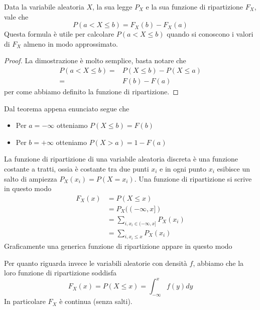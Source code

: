 \begin{theorem}\label{th: diff_cdf}
	Data la variabile aleatoria $X$, la sua legge $P_X$ e la sua funzione di ripartizione $F_X$,
	vale che
	\[ P(a < X \leq b) = F_X (b) - F_X(a) \]
	Questa formula è utile per calcolare $P(a < X \leq b)$ quando si conoscono i valori di $F_X$
	almeno in modo approssimato.
	\begin{proof}
		La dimostrazione è molto semplice, basta notare che
		\begin{align*}
			P(a < X \leq b) = & P(X \leq b) - P(X \leq a) \\
			=                 & F(b) - F(a)
		\end{align*}
		per come abbiamo definito la funzione di ripartizione.
	\end{proof}
\end{theorem}

\begin{observation}
	Dal teorema appena enunciato segue che
	\begin{itemize}
		\item Per $a = -\infty$ otteniamo $P(X \leq b) = F(b)$
		\item Per $b = +\infty$ otteniamo $P(X > a) = 1 - F(a)$
	\end{itemize}
\end{observation}

La funzione di ripartizione di una variabile aleatoria discreta è una funzione
costante a tratti, ossia è costante tra due punti $x_i$ e in ogni punto $x_i$
esibisce un salto di ampiezza $P_X(x_i) = P(X = x_i)$. Una funzione di
ripartizione si scrive in questo modo
\begin{align*}
	F_X(x) & = P(X \leq x)                              \\
	       & = P_X ((-\infty, x])                       \\
	       & = \sum_{i, x_i \in (-\infty, x]} P_X (x_i) \\
	       & = \sum_{i, x_i \leq x} P_X (x_i)
\end{align*}
Graficamente una generica funzione di ripartizione appare in questo modo
\begin{center}
\end{center}
Per quanto riguarda invece le variabili aleatorie con densità $f$, abbiamo che la loro funzione di
ripartizione soddisfa
\[ F_X(x) = P(X \leq x) = \int_{-\infty}^x f(y) dy \]
In particolare $F_X$ è continua (senza salti).


